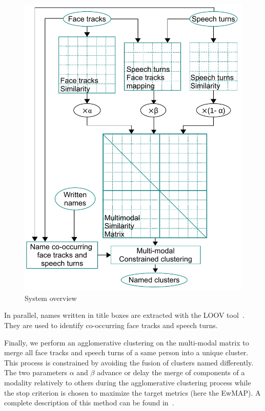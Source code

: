 \documentclass{acm_proc_article-me}
\begin{document}
\begin{figure}[htb]
 \centering
 \includegraphics[width=1.0\linewidth]{figs/schema_clus_contraint.pdf}
 \caption {System overview}
 \label{fig:gene}
\end{figure}

In parallel, names written in title boxes are extracted with the LOOV tool~\cite{POIGNANT--ICME--2012}. They are used to identify co-occurring face tracks and speech turns.

Finally, we perform an agglomerative clustering on the multi-modal matrix to merge all face tracks and speech turns of a same person into a unique cluster. This process is constrained by avoiding the fusion of clusters named differently. The two parameters $\alpha$ and $\beta$ advance or delay the merge of components of a modality relatively to others during the agglomerative clustering process while the stop criterion is chosen to maximize the target metrics (here the EwMAP). A complete description of this method can be found in~\cite{POIGNANT--MTAP--2015}.
\end{document}
